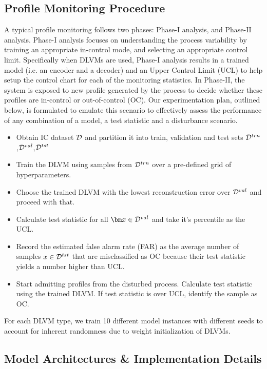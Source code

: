 \documentclass{scrartcl}
\theoremstyle{definition}
\begin{document}
\subsection{Profile Monitoring Procedure}
\label{sec:methodology:procedure}
A typical profile monitoring follows two phases: Phase-I analysis, and Phase-II analysis. Phase-I analysis focuses  on understanding the process variability by training an appropriate in-control mode, and selecting an appropriate control limit. 
Specifically when DLVMs are used, Phase-I analysis results in a trained model (i.e. an encoder and a decoder) and an Upper Control Limit (UCL) to help setup the control chart for each of the monitoring statistics.
In Phase-II, the system is exposed to new profile generated by the process to decide whether these profiles are in-control or out-of-control (OC).
Our experimentation plan, outlined below, is formulated to emulate this scenario to effectively assess the performance of any combination of a model, a test statistic and a disturbance scenario.
\begin{itemize}
	\item Obtain IC dataset $ \mathcal{D} $ and partition it into train, validation and test sets $ \mathcal{D}^{trn} $,$ \mathcal{D}^{val} $,$ \mathcal{D}^{tst} $
	\item Train the DLVM using samples from $\mathcal{D}^{trn}$ over a pre-defined grid of hyperparameters.
	\item Choose the trained DLVM with the lowest reconstruction error over $\mathcal{D}^{val}$ and proceed with that.
	\item Calculate test statistic for all $ \mbx \in \dataset^{val} $ and take it's  percentile as the UCL.
	\item Record the estimated false alarm rate (FAR)  as the average number of samples $ x \in \mathcal{D}^{tst} $ that are misclassified as OC because their test statistic yields a number higher than UCL.
	\item Start admitting profiles from the disturbed process. Calculate test statistic using the trained DLVM. If test statistic is over UCL, identify the sample as OC.
\end{itemize}
For each DLVM type, we train 10 different model instances with different seeds to account for inherent randomness due to weight initialization of DLVMs.

\subsection{Model Architectures \& Implementation Details}
 
\end{document}
